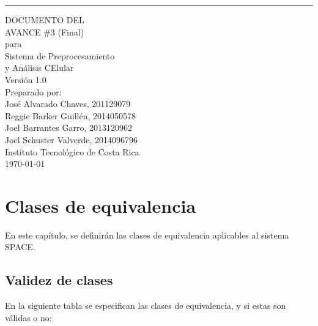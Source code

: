 \documentclass{scrreprt}
\date{}
\def\myversion{1.0}
\begin{document}
\setlength{\abovedisplayskip}{-10pt}
\setlength{\belowdisplayskip}{-10pt}
\setlength{\abovedisplayshortskip}{-10pt}
\setlength{\belowdisplayshortskip}{-10pt}

\begin{flushright}
	\rule{16cm}{0.2cm}\vskip1cm
    \begin{bfseries}
        \Huge{DOCUMENTO DEL \\ AVANCE \#3 (Final)}\\
        \vspace{0.5cm}
        para\\
        \vspace{0.5cm}
        Sistema de Preprocesamiento\\ y Análisis CElular\\
        \vspace{1.0cm}
        \LARGE{Versión \myversion}\\
        \vspace{1.0cm}
        Preparado por:\\ \vspace{0.5cm}
        	José Alvarado Chaves, 201129079\\
            Reggie Barker Guillén, 2014050578\\
            Joel Barrantes Garro, 2013120962\\
            Joel Schuster Valverde, 2014096796\\                        
        \vspace{1.5cm}
        Instituto Tecnológico de Costa Rica\\
        \vspace{1.5cm}
        \today\\
    \end{bfseries}
\end{flushright}


\tableofcontents


\chapter{Clases de equivalencia}

En este capítulo, se definirán las clases de equivalencia aplicables al sistema SPACE.

\section{Validez de clases}

En la siguiente tabla se especifican las clases de equivalencia, y si estas son válidas o no:
\end{document}
